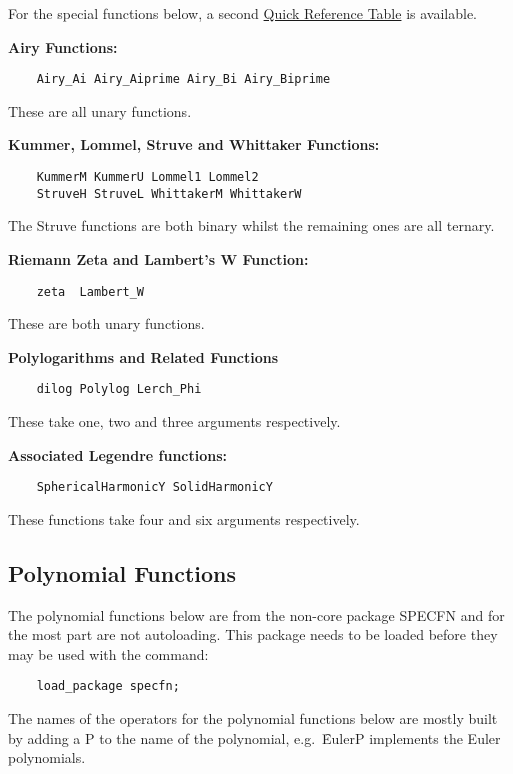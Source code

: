 For the special functions below, a second
\hyperlink{SPECFNTAB2}{Quick Reference Table} is available.

\textbf{Airy Functions:}
\begin{verbatim}
    Airy_Ai Airy_Aiprime Airy_Bi Airy_Biprime
\end{verbatim}
These are all unary functions.

\textbf{Kummer, Lommel, Struve and Whittaker Functions:}
\begin{verbatim}
    KummerM KummerU Lommel1 Lommel2
    StruveH StruveL WhittakerM WhittakerW
\end{verbatim}
The Struve functions are both binary whilst the remaining ones are all ternary.

 
\textbf{Riemann Zeta and Lambert's W Function:}
\begin{verbatim}
    zeta  Lambert_W
\end{verbatim}
These are both unary functions.

 
\textbf{Polylogarithms and Related Functions}
\nopagebreak
\begin{verbatim}
    dilog Polylog Lerch_Phi
\end{verbatim}
These take one, two and three arguments respectively.

\textbf{Associated Legendre functions:}
\begin{verbatim}
    SphericalHarmonicY SolidHarmonicY
\end{verbatim}
These functions take four and six arguments respectively.

\subsection{Polynomial Functions}
The polynomial functions below are from the non-core package SPECFN
and for the most part are not autoloading. This package needs to be loaded
before they may be used with the command:
\begin{verbatim}
    load_package specfn;
\end{verbatim}
The names of the {\REDUCE} operators for the polynomial functions below
are mostly built by adding a P to the name of the polynomial,
e.g.\ \f{EulerP} implements the Euler polynomials.

